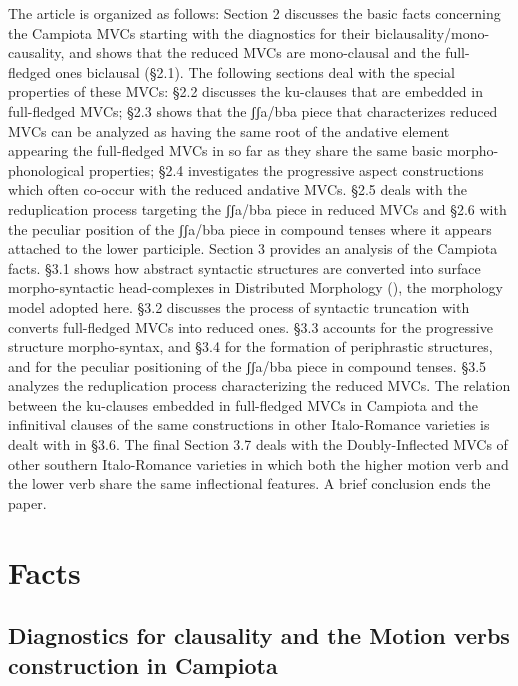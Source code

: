 \documentclass[output=paper]{langscibook}
\begin{document}
The article is organized as follows:  Section 2 discusses the basic facts concerning the Campiota MVCs starting with the diagnostics for their biclausality/mono-causality, and shows that the reduced MVCs are mono-clausal and the full-fledged ones biclausal (§2.1).  The following sections deal with the special properties of these MVCs:  §2.2 discusses the ku-clauses that are embedded in full-fledged MVCs; §2.3 shows that the ʃʃa/bba piece that characterizes reduced MVCs can be analyzed as having the same root of the andative element appearing  the full-fledged MVCs in so far as they share the same basic morpho-phonological properties; §2.4 investigates the progressive aspect constructions which often co-occur with the reduced andative MVCs. §2.5 deals with the reduplication process targeting the ʃʃa/bba piece in reduced MVCs and §2.6 with the peculiar position of the ʃʃa/bba piece in compound tenses where it appears attached to the lower participle.  Section 3 provides an analysis of the Campiota facts. §3.1 shows how abstract syntactic structures are converted into surface morpho-syntactic head-complexes in Distributed Morphology (\cite{halle1993a}), the morphology model adopted here. §3.2 discusses the process of syntactic truncation with converts full-fledged MVCs into reduced ones. §3.3 accounts for the progressive structure morpho-syntax, and §3.4 for the formation of periphrastic structures, and for the peculiar positioning of the ʃʃa/bba piece in compound tenses. §3.5 analyzes the reduplication process characterizing the reduced MVCs. The relation between the ku-clauses embedded in full-fledged MVCs in Campiota and the infinitival clauses of the same constructions in other Italo-Romance varieties is dealt with in §3.6. The final Section 3.7 deals with the Doubly-Inflected MVCs of other southern Italo-Romance varieties in which both the higher motion verb and the lower verb share the same inflectional features. A brief conclusion ends the paper.

\section{Facts}
\subsection{Diagnostics for clausality and the Motion verbs construction in Campiota}
\end{document}
